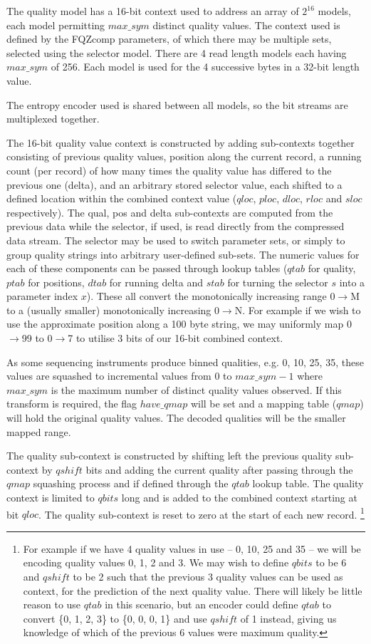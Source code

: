 \documentclass[a4paper]{article}
\begin{document}
The quality model has a 16-bit context used to address an array of
$2^{16}$ models, each model permitting $max\_sym$ distinct quality
values.  The context used is defined by the FQZcomp parameters, of
which there may be multiple sets, selected using the selector model.
There are 4 read length models each having $max\_sym$ of 256.  Each
model is used for the 4 successive bytes in a 32-bit length value.

The entropy encoder used is shared between all models, so the bit
streams are multiplexed together.

The 16-bit quality value context is constructed by adding sub-contexts
together consisting of previous quality values, position along the
current record, a running count (per record) of how many times the
quality value has differed to the previous one (delta), and an
arbitrary stored selector value, each shifted to a defined location
within the combined context value ($qloc$, $ploc$, $dloc$, $rloc$ and
$sloc$ respectively).  The qual, pos and delta sub-contexts are
computed from the previous data while the selector, if used, is read
directly from the compressed data stream.  The selector may be used to
switch parameter sets, or simply to group quality strings into
arbitrary user-defined sub-sets.  The numeric values for each of these
components can be passed through lookup tables ($qtab$ for quality,
$ptab$ for positions, $dtab$ for running delta and $stab$ for turning
the selector $s$ into a parameter index $x$).  These all convert the
monotonically increasing range 0$\rightarrow$M to a (usually smaller)
monotonically increasing 0$\rightarrow$N.  For example if we wish to
use the approximate position along a 100 byte string, we may uniformly
map 0$\rightarrow$99 to 0$\rightarrow$7 to utilise 3 bits of our
16-bit combined context.

As some sequencing instruments produce binned qualities, e.g. 0, 10, 25,
35, these values are squashed to incremental values from 0 to
$max\_sym-1$ where $max\_sym$ is the maximum number of distinct
quality values observed.  If this transform is required, the flag
$have\_qmap$ will be set and a mapping table ($qmap$) will hold the
original quality values.  The decoded qualities will be the smaller
mapped range.

The quality sub-context is constructed by shifting left the previous
quality sub-context by $qshift$ bits and adding the current quality
after passing through the $qmap$ squashing process and if defined
through the $qtab$ lookup table.  The quality context is limited to
$qbits$ long and is added to the combined context starting at bit
$qloc$.  The quality sub-context is reset to zero at the start of each
new record.
\footnote{For example if we have 4 quality values in use -- 0, 10, 25 and
35 -- we will be encoding quality values 0, 1, 2 and 3.  We may wish to
define $qbits$ to be 6 and $qshift$ to be 2 such that the previous 3
quality values can be used as context, for the prediction of the next
quality value.  There will likely be little reason to use $qtab$ in
this scenario, but an encoder could define $qtab$ to convert \{0, 1, 2, 3\}
to \{0, 0, 0, 1\} and use $qshift$ of 1 instead, giving us
knowledge of which of the previous 6 values were maximum quality.}
\end{document}
